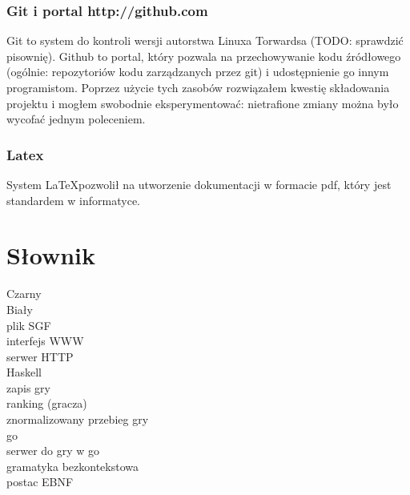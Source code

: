 \documentclass[10pt,leqno]{article}
\begin{document}
\subsubsection{Git i portal http://github.com}
Git to system do kontroli wersji autorstwa Linuxa Torwardsa (TODO: sprawdzić pisownię). Github to portal, który pozwala
na przechowywanie kodu źródłowego (ogólnie: repozytoriów kodu zarządzanych przez git) i udostępnienie go innym programistom.
Poprzez użycie tych zasobów rozwiązałem kwestię składowania projektu i mogłem swobodnie eksperymentować: nietrafione zmiany
można było wycofać jednym poleceniem.

\subsubsection{Latex}
System \LaTeX pozwolił na utworzenie dokumentacji w formacie pdf, który jest standardem w informatyce.

\section{Słownik}
Czarny \\
Biały \\
plik SGF \\
interfejs WWW \\
serwer HTTP \\
Haskell \\
zapis gry \\
ranking (gracza) \\
znormalizowany przebieg gry \\
go \\
serwer do gry w go \\
gramatyka bezkontekstowa \\
postac EBNF \\ 

\end{document}
